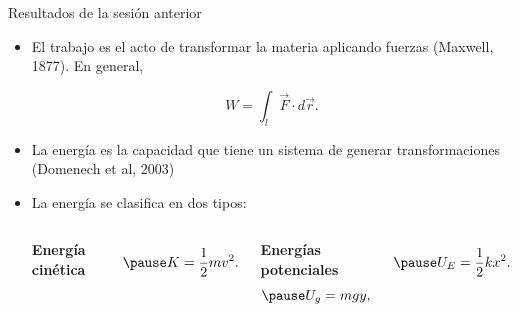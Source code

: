     \begin{frame}{Resultados de la sesión anterior}
        
    \begin{itemize}
        \pause \item El trabajo es el acto de transformar la materia aplicando fuerzas (Maxwell, 1877).
        En general,
        
        \pause $$W=\int_l \Vec{F}\cdot d\Vec{r}.$$
        
        \pause \item La energía es la capacidad que tiene un sistema de generar transformaciones (Domenech et al, 2003)
        
        \pause \item La energía se clasifica en dos tipos:
        \vspace{0.5em}
        
        \begin{columns}
            \column[t]{6cm}
            \centering
            \pause \textbf{Energía cinética}
            
            \begin{equation}
            \pause     K=\frac{1}{2}mv^2.
            \end{equation}
            
            \column[t]{6cm}
            \centering
            \pause \textbf{Energías potenciales}
            \begin{equation}
             \pause    U_g=mgy,
            \end{equation}
            
            \begin{equation}
             \pause    U_E=\frac{1}{2}kx^2.
            \end{equation}
            
        \end{columns}
    \end{itemize}
        
    \end{frame}
    
    
